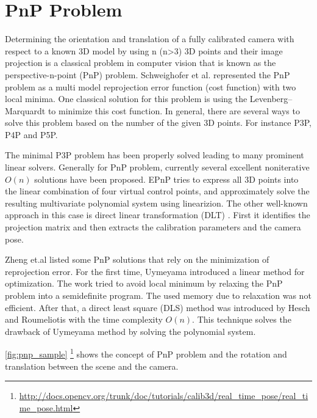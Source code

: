 \section{PnP Problem} \label{sec:PnP_problem}
Determining the orientation and translation of a fully calibrated camera with respect to a known 3D model by using n (n>3) 3D points and their image projection is a classical problem in computer vision that is known as the perspective-n-point (PnP) problem. Schweighofer et al. \cite{schweighofer2006robust} represented the PnP problem as a multi model reprojection error function (cost function) with two local minima. One classical solution for this problem is using the Levenberg–Marquardt to minimize this cost function. In general, there are several ways to solve this problem based on the number of the given 3D points. For instance P3P, P4P and P5P. 

The minimal P3P problem has been properly solved leading to many prominent linear solvers. Generally for PnP problem, currently several excellent noniterative $O(n)$ solutions have been proposed. EPnP \cite{lepetit2009epnp} tries to express all 3D points into the linear combination of four virtual control points, and approximately solve the resulting multivariate polynomial system using linearizion. The other well-known approach in this case is direct linear transformation (DLT) \cite{hartley2003multiple}. First it identifies the projection matrix and then extracts the calibration parameters and the camera pose.

Zheng et.al \cite{zheng2013revisiting} listed some PnP solutions that rely on the minimization of reprojection error. For the first time, Uymeyama \cite{umeyama1991least} introduced a linear method for optimization. The work tried to avoid local minimum by relaxing the PnP problem into a semidefinite program. The used memory due to relaxation was not efficient. After that, a direct least square (DLS) method was introduced by Hesch and Roumeliotis \cite{hesch2011direct} with the time complexity $O(n)$. This technique solves the drawback of Uymeyama method by solving the polynomial system.

\autoref{fig:pnp_sample} \footnote{\url{http://docs.opencv.org/trunk/doc/tutorials/calib3d/real_time_pose/real_time_pose.html}} shows the concept of PnP problem and the rotation and translation between the scene and the camera.

